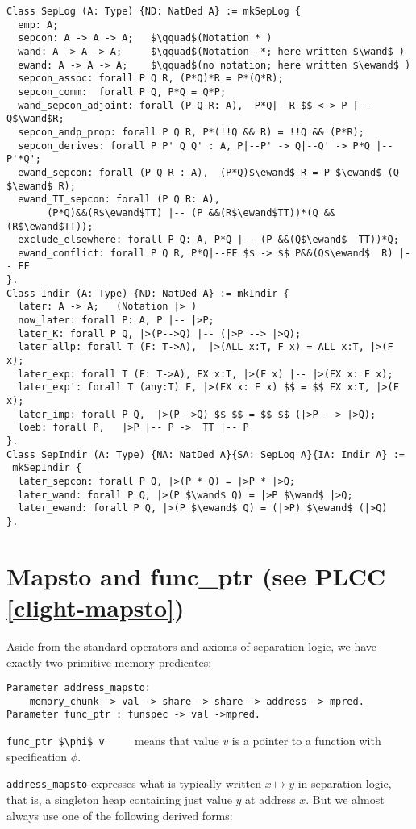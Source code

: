 \documentclass[12pt,fleqn,openany,oneside,showtrims]{memoir}
\newcommand{\ychapter}[2]{\chapter[#1]{#1 \hfill \normalsize #2}}
\begin{document}
\clearpage
\begin{lstlisting}
Class SepLog (A: Type) {ND: NatDed A} := mkSepLog {
  emp: A;
  sepcon: A -> A -> A;   $\qquad$(Notation * )
  wand: A -> A -> A;     $\qquad$(Notation -*; here written $\wand$ )
  ewand: A -> A -> A;    $\qquad$(no notation; here written $\ewand$ )
  sepcon_assoc: forall P Q R, (P*Q)*R = P*(Q*R);
  sepcon_comm:  forall P Q, P*Q = Q*P;
  wand_sepcon_adjoint: forall (P Q R: A),  P*Q|--R $$ <-> P |-- Q$\wand$R;
  sepcon_andp_prop: forall P Q R, P*(!!Q && R) = !!Q && (P*R);
  sepcon_derives: forall P P' Q Q' : A, P|--P' -> Q|--Q' -> P*Q |-- P'*Q';
  ewand_sepcon: forall (P Q R : A),  (P*Q)$\ewand$ R = P $\ewand$ (Q $\ewand$ R);
  ewand_TT_sepcon: forall (P Q R: A),
       (P*Q)&&(R$\ewand$TT) |-- (P &&(R$\ewand$TT))*(Q && (R$\ewand$TT));
  exclude_elsewhere: forall P Q: A, P*Q |-- (P &&(Q$\ewand$  TT))*Q;
  ewand_conflict: forall P Q R, P*Q|--FF $$ -> $$ P&&(Q$\ewand$  R) |-- FF
}.
Class Indir (A: Type) {ND: NatDed A} := mkIndir {
  later: A -> A;   (Notation |> )
  now_later: forall P: A, P |-- |>P;
  later_K: forall P Q, |>(P-->Q) |-- (|>P --> |>Q);
  later_allp: forall T (F: T->A),  |>(ALL x:T, F x) = ALL x:T, |>(F x);
  later_exp: forall T (F: T->A), EX x:T, |>(F x) |-- |>(EX x: F x);
  later_exp': forall T (any:T) F, |>(EX x: F x) $$ = $$ EX x:T, |>(F x);
  later_imp: forall P Q,  |>(P-->Q) $$ $$ = $$ $$ (|>P --> |>Q);
  loeb: forall P,   |>P |-- P ->  TT |-- P
}.
Class SepIndir (A: Type) {NA: NatDed A}{SA: SepLog A}{IA: Indir A} := 
 mkSepIndir {
  later_sepcon: forall P Q, |>(P * Q) = |>P * |>Q;
  later_wand: forall P Q, |>(P $\wand$ Q) = |>P $\wand$ |>Q;
  later_ewand: forall P Q, |>(P $\ewand$ Q) = (|>P) $\ewand$ (|>Q)
}.
\end{lstlisting}
\vspace*{-24pt}
\ychapter{Mapsto and func\_ptr}{(see PLCC \autoref{clight-mapsto})}

Aside from the standard operators and axioms of separation logic,
we have exactly two primitive
memory predicates:

\begin{lstlisting}
Parameter address_mapsto: 
    memory_chunk -> val -> share -> share -> address -> mpred.
Parameter func_ptr : funspec -> val ->mpred.
\end{lstlisting}
\lstinline{func_ptr $\phi$ v} $\qquad$ means that value $v$
is a pointer to a function with specification $\phi$.

\lstinline{address_mapsto} expresses what is typically
written $x\mapsto y$ in separation logic,
that is, a singleton heap containing just value $y$ at address $x$.
But we almost always use one of the following derived forms:
\end{document}
